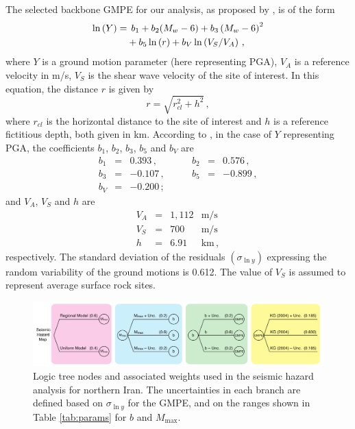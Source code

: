 The selected backbone GMPE for our analysis, as proposed by \citet{Kalkan2004}, is of the form
%
\begin{align}
	\ln \left( Y \right) =
		& \hspace{1ex} b_1 + b_2(M_w - 6) + b_3 \left( M_w - 6 \right)^{2} \nonumber \\
		& + b_5 \ln \left( r \right) + b_V \ln \left( V_S / V_A \right)
	\, ,
\end{align}
%
where $Y$ is a ground motion parameter (here representing PGA), $V_A$ is a reference velocity in m/s,  $V_S$ is the shear wave velocity of the site of interest. In this equation, the distance $r$ is given by
%
\begin{equation}
	r= \sqrt{ r^2_{\mathit{cl}} + h^2 }
	\, ,
\end{equation}
%
where $r_{\mathit{cl}}$ is the horizontal distance to the site of interest and $h$ is a reference fictitious depth, both given in km. According to \citet{Kalkan2004}, in the case of $Y$ representing PGA, the coefficients $b_1$, $b_2$, $b_3$, $b_5$ and $b_V$ are
%
\begin{equation}
\begin{array}{lcrlcr}
	b_1 &=&  0.393   \,,&\hspace{2em}   b_2 &=& 0.576\,,   \\
	b_3 &=& -0.107   \,,&\hspace{2em}   b_5 &=& -0.899\,,  \\
	b_V &=& -0.200   \,;
	\nonumber
\end{array}
\end{equation}
%
and $V_A$, $V_S$ and $h$ are
%
\begin{equation}
\begin{array}{lcrl}
	V_A &=& 1,112 & \mathrm{m/s}	\\
	V_S &=&   700 & \mathrm{m/s}	\\
	h   &=&  6.91 & \mathrm{km}\,,
	\nonumber
\end{array}
\end{equation}
%
respectively. The standard deviation of the residuals $(\sigma_{\ln y})$ expressing the random variability of the ground motions is 0.612. The value of $V_S$ is assumed to represent average surface rock sites.

\begin{figure}[t]
    \centering
    \includegraphics[width=\textwidth]{figures/pdf/figure-09}
    \caption{Logic tree nodes and associated weights used in the seismic hazard analysis for northern Iran. The uncertainties in each branch are defined based on $\sigma_{\ln y}$ for the GMPE, and on the ranges shown in Table \ref{tab:params} for $b$ and $M_{\max}$.}
    \label{fig:logic}
\end{figure}

